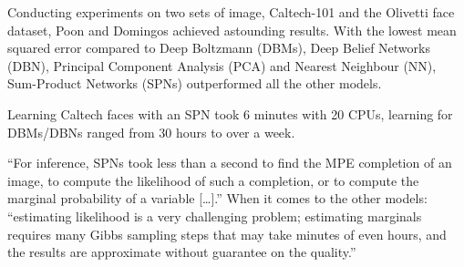 \documentclass[a4paper,10pt]{article}
\theoremstyle{plain}
\begin{document}
Conducting experiments on two sets of image, Caltech-101 and the Olivetti face dataset, Poon and
Domingos achieved astounding results. With the lowest mean squared error compared to Deep Boltzmann
(DBMs), Deep Belief Networks (DBN), Principal Component Analysis (PCA) and Nearest Neighbour (NN),
Sum-Product Networks (SPNs) outperformed all the other models.

Learning Caltech faces with an SPN took 6 minutes with 20 CPUs, learning for DBMs/DBNs ranged from
30 hours to over a week.\cite{poon-domingos}

``For inference, SPNs took less than a second to find the MPE completion of an image, to compute
the likelihood of such a completion, or to compute the marginal probability of a variable
[\ldots].'' When it comes to the other models: ``estimating likelihood is a very challenging
problem; estimating marginals requires many Gibbs sampling steps that may take minutes of even
hours, and the results are approximate without guarantee on the quality.''~\cite{poon-domingos}

\begin{figure}[h]
\end{figure}
\end{document}
